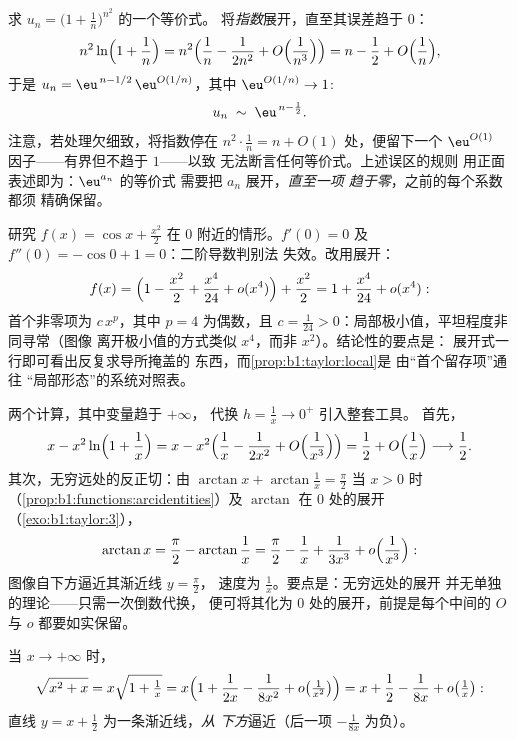 \begin{example}[指数须展开到 $o(1)$]\label{ex:b1:taylor:expdiscipline}
求 $u_n = \bigl(1 + \frac1n\bigr)^{n^2}$ 的一个等价式。
将\emph{指数}展开，直至其误差趋于 $0$：
\[
n^2 \ln\Bigl(1 + \frac1n\Bigr)
= n^2\Bigl(\frac1n - \frac{1}{2n^2} +
O\Bigl(\frac{1}{n^3}\Bigr)\Bigr)
= n - \frac12 + O\Bigl(\frac1n\Bigr),
\]
于是 $u_n = \eu^{\,n - 1/2}\,\eu^{O(1/n)}$，其中 $\eu^{O(1/n)} \to
1$:
\[
u_n \;\sim\; \eu^{\,n - \frac12} .
\]
注意，若处理欠细致，将指数停在
$n^2\cdot\frac1n = n + O(1)$ 处，便留下一个
$\eu^{O(1)}$ 因子——有界但不趋于 $1$——以致
无法断言任何等价式。上述误区的规则
用正面表述即为：$\eu^{a_n}$ 的等价式
需要把 $a_n$ 展开，\emph{直至一项
趋于零}，之前的每个系数都须
精确保留。
\end{example}

\begin{example}[平坦临界点的分类]\label{ex:b1:taylor:flatmin}
研究 $f(x) = \cos x + \frac{x^2}{2}$ 在 $0$ 附近的情形。$f'(0) =
0$ 及 $f''(0) = -\cos 0 + 1 = 0$：二阶导数判别法
失效。改用展开：
\[
f(x) = \Bigl(1 - \frac{x^2}{2} + \frac{x^4}{24} +
o(x^4)\Bigr) + \frac{x^2}{2}
= 1 + \frac{x^4}{24} + o(x^4) :
\]
首个非零项为 $c\,x^p$，其中 $p = 4$ 为偶数，且 $c =
\frac{1}{24} > 0$：局部极小值，平坦程度非同寻常（图像
离开极小值的方式类似 $x^4$，而非 $x^2$）。结论性的要点是：
展开式一行即可看出反复求导所掩盖的
东西，而\cref{prop:b1:taylor:local}是
由“首个留存项”通往
“局部形态”的系统对照表。
\end{example}

\begin{example}[无穷远处的展开]\label{ex:b1:taylor:atinfinity}
两个计算，其中变量趋于 $+\infty$，
代换 $h = \frac1x \to 0^+$ 引入整套工具。
首先，
\[
x - x^2\ln\Bigl(1 + \frac1x\Bigr)
= x - x^2\Bigl(\frac1x - \frac{1}{2x^2} +
O\Bigl(\frac{1}{x^3}\Bigr)\Bigr)
= \frac12 + O\Bigl(\frac1x\Bigr) \longrightarrow \frac12 .
\]
其次，无穷远处的反正切：由 $\arctan x +
\arctan\frac1x = \frac\pi2$ 当 $x > 0$ 时
（\cref{prop:b1:functions:arcidentities}）及
$\arctan$ 在 $0$ 处的展开（\cref{exo:b1:taylor:3}），
\[
\arctan x = \frac\pi2 - \arctan\frac1x
= \frac\pi2 - \frac1x + \frac{1}{3x^3} +
o\Bigl(\frac{1}{x^3}\Bigr) :
\]
图像自下方逼近其渐近线 $y = \frac\pi2$，
速度为 $\frac1x$。要点是：无穷远处的展开
并无单独的理论——只需一次倒数代换，
便可将其化为 $0$ 处的展开，前提是每个中间的
$O$ 与 $o$ 都要如实保留。
\end{example}

\begin{example}[用展开求渐近线]\label{ex:b1:taylor:asymptote}
当 $x \to +\infty$ 时，
\[
\sqrt{x^2 + x} = x\sqrt{1 + \tfrac1x}
= x\Bigl(1 + \frac{1}{2x} - \frac{1}{8x^2} + o\bigl(\tfrac{1}{x^2}\bigr)\Bigr)
= x + \frac12 - \frac{1}{8x} + o\bigl(\tfrac 1x\bigr):
\]
直线 $y = x + \frac12$ 为一条渐近线，\emph{从
下方}逼近（后一项 $-\frac{1}{8x}$ 为负）。
\end{example}

